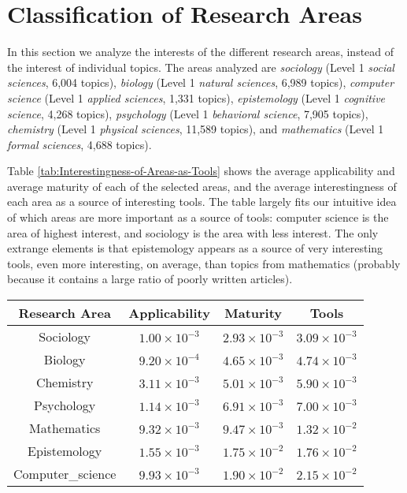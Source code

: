%
%
\section{Classification of Research Areas}

In this section we analyze the interests of the different research
areas, instead of the interest of individual topics. The areas analyzed
are \emph{sociology} (Level 1 \emph{social sciences}, 6,004 topics),
\emph{biology} (Level 1 \emph{natural sciences}, 6,989 topics), \emph{computer
science} (Level 1 \emph{applied sciences}, 1,331 topics), \emph{epistemology}
(Level 1 \emph{cognitive science}, 4,268 topics), \emph{psychology}
(Level 1 \emph{behavioral science}, 7,905 topics), \emph{chemistry}
(Level 1 \emph{physical sciences}, 11,589 topics), and \emph{mathematics}
(Level 1 \emph{formal sciences}, 4,688 topics).

Table \ref{tab:Interestingness-of-Areas-as-Tools} shows the average
applicability and average maturity of each of the selected areas,
and the average interestingness of each area as a source of interesting
tools. The table largely fits our intuitive idea of which areas are
more important as a source of tools: computer science is the area
of highest interest, and sociology is the area with less interest.
The only extrange elements is that epistemology appears as a source
of very interesting tools, even more interesting, on average, than
topics from mathematics (probably because it contains a large ratio
of poorly written articles).

\begin{table*}
\begin{centering}
\begin{tabular}{|c|c|c|c|}
\hline 
Research Area & Applicability & Maturity & Tools\tabularnewline
\hline 
\hline 
Sociology & $1.00\times10^{-3}$ & $2.93\times10^{-3}$ & $3.09\times10^{-3}$\tabularnewline
\hline 
Biology & $9.20\times10^{-4}$ & $4.65\times10^{-3}$ & $4.74\times10^{-3}$\tabularnewline
\hline 
Chemistry & $3.11\times10^{-3}$ & $5.01\times10^{-3}$ & $5.90\times10^{-3}$\tabularnewline
\hline 
Psychology & $1.14\times10^{-3}$ & $6.91\times10^{-3}$ & $7.00\times10^{-3}$\tabularnewline
\hline 
Mathematics & $9.32\times10^{-3}$ & $9.47\times10^{-3}$ & $1.32\times10^{-2}$\tabularnewline
\hline 
Epistemology & $1.55\times10^{-3}$ & $1.75\times10^{-2}$ & $1.76\times10^{-2}$\tabularnewline
\hline 
Computer\_science & $9.93\times10^{-3}$ & $1.90\times10^{-2}$ & $2.15\times10^{-2}$\tabularnewline
\hline 
\end{tabular}
\par\end{centering}

\caption{\label{tab:Interestingness-of-Areas-as-Tools}Interestingness of Areas
as Tools}
\end{table*}


